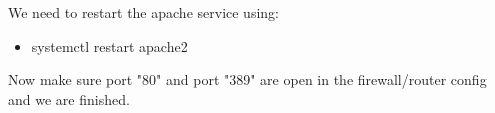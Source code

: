 \vspace{.5em}

\noindent We need to restart the apache service using:
\begin{itemize}
	\item systemctl restart apache2
\end{itemize}

\vspace{.5em}

\noindent Now make sure port "80" and port "389" are open in the 
firewall/router config and we are finished.

